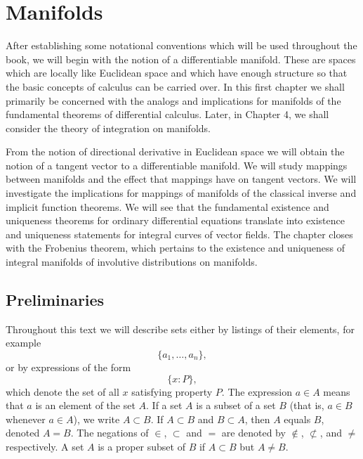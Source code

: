 \chapter{Manifolds}

After establishing some notational conventions which will be used throughout the book,
we will begin with the notion of a differentiable manifold. These are spaces which are
locally like Euclidean space and which have enough structure so that the basic concepts
of calculus can be carried over. In this first chapter we shall primarily be concerned
with the analogs and implications for manifolds of the fundamental theorems of differential
calculus. Later, in Chapter 4, we shall consider the theory of integration on manifolds.

From the notion of directional derivative in Euclidean space we will obtain the notion
of a tangent vector to a differentiable manifold. We will study mappings between manifolds
and the effect that mappings have on tangent vectors. We will investigate the implications
for mappings of manifolds of the classical inverse and implicit function theorems. We will
see that the fundamental existence and uniqueness theorems for ordinary differential
equations translate into existence and uniqueness statements for integral curves of
vector fields. The chapter closes with the Frobenius theorem, which pertains to the
existence and uniqueness of integral manifolds of involutive distributions on manifolds.


\section{Preliminaries}

\label{thm:1.1} Throughout this text
we will describe sets either by listings of their elements, for example
\[
	\{a_{1},\ldots,a_{n}\},
\]
or by expressions of the form
\[
	\{x\colon P\},
\]
which denote the set of all $x$ satisfying property $P$. The expression $a\in A$ means that $a$
is an element of the set $A$. If a set $A$ is a subset of a set $B$ (that is, $a\in B$
whenever $a\in A$), we write $A\subset B$. If $A\subset B$ and $B\subset A$, then $A$
equals $B$, denoted $A=B$. The negations of $\in$, $\subset$ and $=$ are denoted by
$\notin$, $\not\subset$, and $\neq$ respectively. A set $A$ is a proper subset of
$B$ if $A\subset B$ but $A\neq B$.

